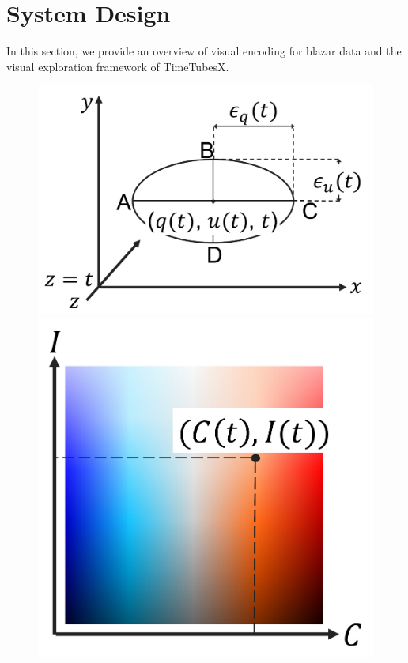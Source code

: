 \section{System Design\label{sec:systemDesign}}
In this section, we provide an overview of visual encoding for blazar data and the visual exploration framework of TimeTubesX.

\begin{figure}[tb]
    \begin{minipage}{0.34\linewidth}
        \centering
        \includegraphics[width=.99\linewidth]{figures/howtoplot.pdf}
    \end{minipage}
    \begin{minipage}{0.26\linewidth}
        \centering
        \includegraphics[width=.99\linewidth]{figures/colormap.pdf}

\end{minipage}
\end{figure}
